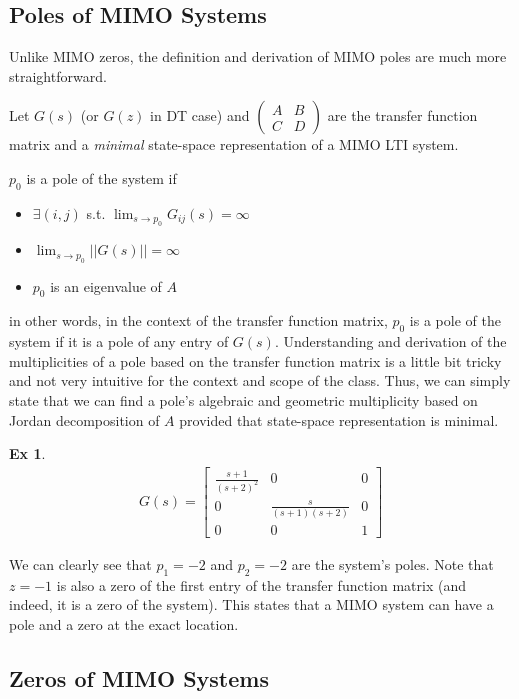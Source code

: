 \documentclass[twoside]{article}
\newtheorem{exmp}[theorem]{Ex}
\begin{document}
\newpage

\subsection{Poles of MIMO Systems}

Unlike MIMO zeros, the definition and derivation of MIMO poles are much more straightforward. 

Let $G(s)$ (or $G(z)$ in DT case) and $\left( \begin{array}{c|c} A & B \\ \hline C & D  \end{array} \right)$ are the transfer function matrix and a \textit{minimal} state-space representation of a MIMO LTI system.

$p_0$ is a pole of the system if 
%
\begin{itemize}
 \item $\exists (i,j)$ s.t. $\lim_{s \to p_0}G_{ij}(s) = \infty$
 \item $\lim_{s \to p_0} || G(s) || = \infty$
 \item $p_0$ is an eigenvalue of $A$
\end{itemize}
%
in other words, in the context of the transfer function matrix, $p_0$ is a pole of the system if it is a pole of any entry of
$G(s)$. Understanding and derivation of the multiplicities of a pole based on the transfer function matrix is a little bit tricky 
and not very intuitive for the context and scope of the class. Thus, we can simply state that we can find a pole's algebraic and
geometric multiplicity based on Jordan decomposition of $A$ provided that state-space representation is minimal. 
%
\begin{exmp}
	\begin{align*}
	G(s) = \left[ \begin{array}{ccc} \frac{s+1}{(s+2)^2} & 0 & 0 \\  
	0 & \frac{s}{(s+1)(s+2)} & 0 \\ 0 & 0 & 1  \end{array} \right]
	\end{align*}
\end{exmp}
%
We can clearly see that $p_1 = -2$ and $p_2 = -2$ are the system's poles. Note that $z = -1$ is also a zero of the 
first entry of the transfer function matrix (and indeed, it is a zero of the system). This states that a MIMO system can have 
a pole and a zero at the exact location. 

\subsection{Zeros of MIMO Systems}
\end{document}
